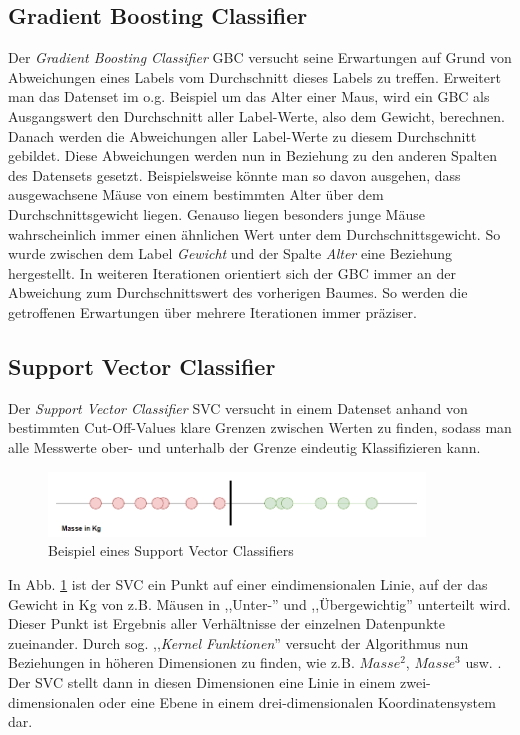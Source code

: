 \subsection{Gradient Boosting Classifier}
Der \textit{Gradient Boosting Classifier} GBC versucht seine Erwartungen auf Grund von Abweichungen eines Labels vom 
Durchschnitt dieses Labels zu treffen. Erweitert man das Datenset im o.g. Beispiel um das Alter einer Maus, wird 
ein GBC als Ausgangswert den Durchschnitt aller Label-Werte, also dem Gewicht, berechnen. Danach werden die 
Abweichungen aller Label-Werte zu diesem Durchschnitt gebildet. Diese Abweichungen werden nun in Beziehung zu den 
anderen Spalten des Datensets gesetzt. Beispielsweise könnte man so davon ausgehen, dass ausgewachsene Mäuse von einem 
bestimmten Alter über dem Durchschnittsgewicht liegen. Genauso liegen besonders junge Mäuse wahrscheinlich immer
einen ähnlichen Wert unter dem Durchschnittsgewicht. So wurde zwischen dem Label \textit{Gewicht} und der Spalte 
\textit{Alter} eine Beziehung hergestellt. In weiteren Iterationen orientiert sich der GBC immer an der Abweichung 
zum Durchschnittswert des vorherigen Baumes. So werden die getroffenen Erwartungen über mehrere Iterationen immer 
präziser.

\subsection{Support Vector Classifier}
Der \textit{Support Vector Classifier} SVC versucht in einem Datenset anhand von bestimmten Cut-Off-Values klare Grenzen 
zwischen Werten zu finden, sodass man alle Messwerte ober- und unterhalb der Grenze eindeutig Klassifizieren 
kann.

\begin{figure}[h]
    \centering
    \includegraphics[width=10.0cm]{pic/SVC_1D.png}
    \caption{Beispiel eines Support Vector Classifiers}
    \label{fig:SVC_1D}
\end{figure}

In Abb. \ref{fig:SVC_1D} ist der SVC ein Punkt auf einer eindimensionalen Linie, auf der das Gewicht in Kg von z.B. 
Mäusen in ,,Unter-'' und ,,Übergewichtig'' unterteilt wird. Dieser Punkt ist Ergebnis aller Verhältnisse der einzelnen
Datenpunkte zueinander. Durch sog. ,,\textit{Kernel Funktionen}'' versucht der Algorithmus nun Beziehungen 
in höheren Dimensionen zu finden, wie z.B. $Masse^2$, $Masse^3$ usw. . Der SVC stellt dann in diesen Dimensionen 
eine Linie in einem zwei-dimensionalen oder eine Ebene in einem drei-dimensionalen Koordinatensystem dar.\\

